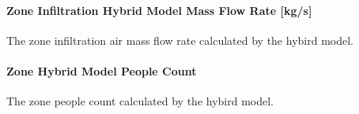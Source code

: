 \paragraph{Zone Infiltration Hybrid Model Mass Flow Rate {[}kg/s{]}}\label{zone-infiltration-hybrid-model-air-mass-flow-rate}

The zone infiltration air mass flow rate calculated by the hybird model.

\paragraph{Zone Hybrid Model People Count}\label{zone-infiltration-hybrid-model-people-count}

The zone people count calculated by the hybird model.